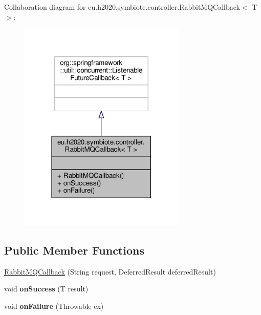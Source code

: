 Collaboration diagram for eu.\+h2020.\+symbiote.\+controller.\+Rabbit\+M\+Q\+Callback$<$ T $>$\+:
\nopagebreak
\begin{figure}[H]
\begin{center}
\leavevmode
\includegraphics[width=225pt]{classeu_1_1h2020_1_1symbiote_1_1controller_1_1RabbitMQCallback__coll__graph}
\end{center}
\end{figure}
\subsection*{Public Member Functions}
\begin{DoxyCompactItemize}
\item 
\hyperlink{classeu_1_1h2020_1_1symbiote_1_1controller_1_1RabbitMQCallback_af36ac8a5a331017d599f76c768a7bdab}{Rabbit\+M\+Q\+Callback} (String request, Deferred\+Result deferred\+Result)
\item 
\mbox{\label{classeu_1_1h2020_1_1symbiote_1_1controller_1_1RabbitMQCallback_a8a046df4e56ad0350dda9de300c6e090}} 
void {\bfseries on\+Success} (T result)
\item 
\mbox{\label{classeu_1_1h2020_1_1symbiote_1_1controller_1_1RabbitMQCallback_ac2d139f5ae551eb2b87aef0b022cd1d6}} 
void {\bfseries on\+Failure} (Throwable ex)
\end{DoxyCompactItemize}


